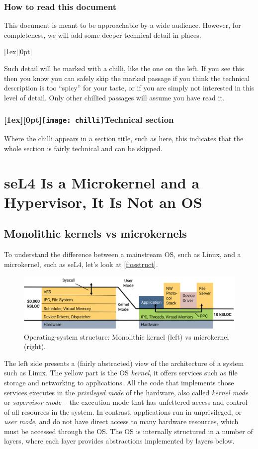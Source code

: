 \documentclass[english,a4paper,12pt\ifDraft,draft\fi]{report}
\newcommand{\Sect}[1]{\section{#1}}
\newcommand{\SSect}[1]{\subsection{#1}}
\newcommand{\SSSect}[1]{\subsubsection*{#1}}
\newcommand{\Sect}[1]{\chapter{#1}}
\newcommand{\SSect}[1]{\section{#1}}
\newcommand{\SSSect}[1]{\subsection*{#1}}
\newlength{\chillilng}\setlength{\chillilng}{8mm}
\newlength{\chillimarg}\setlength{\chillimarg}{10mm}
\newcommand{\chilli}{\texttt{[image: chilli]}}
\newcommand{\chilliItem}{\raisebox{-5mm}[1ex][0pt]{%
      \makebox[\chillilng][r]{\chilli}}}
\newcommand{\chilliSect}{\raisebox{-2mm}[1ex][0pt]{\chilli\hspace{0.8em}}}
\newenvironment{Chilli}{
    \begin{list}{}{
      \setlength{\labelwidth}{\chillilng}
      \setlength{\leftmargin}{\chillimarg}}
    \item[\chilliItem]
    }
  {\end{list}}
\begin{document}
  \SSSect{How to read this document}

  This document is meant to be approachable by a wide
  audience. However, for completeness, we will add some deeper
  technical detail in places.

  \begin{Chilli}
    Such detail will be marked with a chilli, like the one on the left. If you
    see this then you know you can safely skip the marked passage if
    you think the technical description is too ``spicy'' for your
    taste, or if you are simply not interested in this level of
    detail. Only other chillied passages will assume you have read it.
  \end{Chilli}

  \SSSect{\chilliSect Technical section}
  Where the chilli appears in a section title, such as here, this
  indicates that the whole section is fairly technical and can be skipped.

  \Sect{seL4 Is a Microkernel and a Hypervisor, It Is Not an
    OS}\label{s:ukernel}

  \SSect{Monolithic kernels vs microkernels}

  To understand the difference between a mainstream OS, such as Linux,
  and a microkernel, such as seL4, let's look at
  \autoref{f:osstruct}.

  \begin{figure}[hb]
    \centering
    \includegraphics[width=1.0\textwidth]{kernel}
    \caption[Operating-system structure.]{Operating-system structure:
      Monolithic kernel (left) vs microkernel (right).}
    \label{f:osstruct}
  \end{figure}

  The left side presents a (fairly abstracted) view of the
  architecture of a system such as Linux. The yellow part is the OS
  \emph{kernel}, it offers services such as file storage and
  networking to applications.  All the code that implements those
  services executes in the \emph{privileged mode} of the hardware,
  also called \emph{kernel mode} or \emph{supervisor mode} --
  the execution mode that has unfettered access and control of all
  resources in the system. In contrast, applications run in
  unprivileged, or \emph{user mode}, and do not have direct access to
  many hardware resources, which must be accessed through the OS. The
  OS is internally structured in a number of layers, where each layer
  provides abstractions implemented by layers below.
\end{document}
